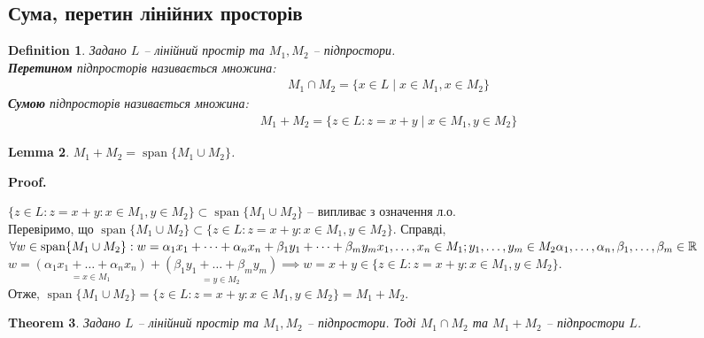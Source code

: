 \documentclass[a4paper, 10pt]{article}
\makeatletter
\theoremstyle{theoremdd}
\newtheorem{theorem}{Theorem}[subsection]
\newtheorem{definition}[theorem]{Definition}
\newtheorem{lemma}[theorem]{Lemma}
\DeclareMathOperator{\linspan}{span}
\renewenvironment{proof}[1][Proof.\\]{\par
\pushQED{\hfill \qed}%
\normalfont \topsep6\p@\@plus6\p@\relax
\trivlist
\item\relax
{\bfseries
#1\@addpunct{.}}\hspace\labelsep\ignorespaces
}{%
\popQED\endtrivlist\@endpefalse
}
\makeatother
\begin{document}
	\subsection{Сума, перетин лінійних просторів}
	\begin{definition}
	Задано $L$ -- лінійний простір та $M_1, M_2$ -- підпростори.\\
	\textbf{Перетином} підпросторів називається множина:
	\begin{align*}
	M_1 \cap M_2 = \{x \in L \mid x \in M_1, x \in M_2 \}
	\end{align*}
	\textbf{Сумою} підпросторів називається множина:
	\begin{align*}
	M_1 + M_2 = \{z \in L: z = x + y \mid x \in M_1, y \in M_2\}
	\end{align*}
	\end{definition}
	
	\begin{lemma}
	$M_1 + M_2 = \linspan\{M_1 \cup M_2\}$.
	\end{lemma}
	
	\begin{proof}
	$\{z \in L: z = x+y: x \in M_1, y \in M_2\} \subset \linspan\{M_1 \cup M_2\}$ -- випливає з означення л.о.\\
	Перевіримо, що $\linspan\{M_1 \cup M_2\} \subset \{z \in L: z = x+y: x \in M_1, y \in M_2\}$. Справді,\\
	$\forall w \in \linspan\{M_1 \cup M_2\}: w = \alpha_1 x_1 + \dots + \alpha_n x_n + \beta_1 y_1 + \dots + \beta_m y_m \\ x_1, \dots, x_n \in M_1; y_1, \dots, y_m \in M_2 \\ \alpha_1, \dots, \alpha_n, \beta_1, \dots, \beta_m \in \mathbb{R}$\\
	$w = \underset{= x \in M_1}{(\alpha_1 x_1 + \dots + \alpha_n x_n )}+ \underset{= y \in M_2}{(\beta_1 y_1 + \dots + \beta_m y_m)} \implies w = x + y \in \{z \in L: z = x+y: x \in M_1, y \in M_2\}$.\\
	Отже, $\linspan\{M_1 \cup M_2\} = \{z \in L: z = x+y: x \in M_1, y \in M_2\} = M_1 + M_2$.
	\end{proof}
	
	\begin{theorem}
	Задано $L$ -- лінійний простір та $M_1,M_2$ -- підпростори. Тоді $M_1 \cap M_2$ та $M_1 + M_2$ -- підпростори $L$.
	\end{theorem}
	
\end{document}
